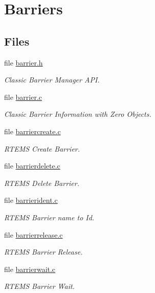 \hypertarget{group__ClassicBarrier}{}\section{Barriers}
\label{group__ClassicBarrier}
\subsection*{Files}
\begin{DoxyCompactItemize}
\item 
file \mbox{\hyperlink{barrier_8h}{barrier.\+h}}
\begin{DoxyCompactList}\small\item\em Classic Barrier Manager A\+PI. \end{DoxyCompactList}\item 
file \mbox{\hyperlink{barrier_8c}{barrier.\+c}}
\begin{DoxyCompactList}\small\item\em Classic Barrier Information with Zero Objects. \end{DoxyCompactList}\item 
file \mbox{\hyperlink{barriercreate_8c}{barriercreate.\+c}}
\begin{DoxyCompactList}\small\item\em R\+T\+E\+MS Create Barrier. \end{DoxyCompactList}\item 
file \mbox{\hyperlink{barrierdelete_8c}{barrierdelete.\+c}}
\begin{DoxyCompactList}\small\item\em R\+T\+E\+MS Delete Barrier. \end{DoxyCompactList}\item 
file \mbox{\hyperlink{barrierident_8c}{barrierident.\+c}}
\begin{DoxyCompactList}\small\item\em R\+T\+E\+MS Barrier name to Id. \end{DoxyCompactList}\item 
file \mbox{\hyperlink{barrierrelease_8c}{barrierrelease.\+c}}
\begin{DoxyCompactList}\small\item\em R\+T\+E\+MS Barrier Release. \end{DoxyCompactList}\item 
file \mbox{\hyperlink{barrierwait_8c}{barrierwait.\+c}}
\begin{DoxyCompactList}\small\item\em R\+T\+E\+MS Barrier Wait. \end{DoxyCompactList}\end{DoxyCompactItemize}
